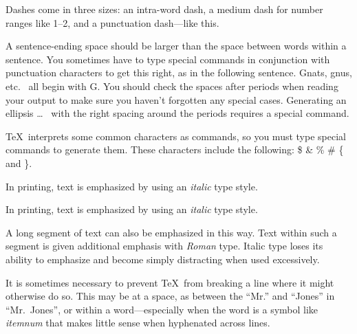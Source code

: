 \documentclass{cernatsreport}    %
\begin{document}
Dashes come in three sizes: an
       intra-word
dash, a medium dash for number ranges like
       1--2,
and a punctuation
       dash---like
this.

A sentence-ending space should be larger than the space between words
within a sentence.  You sometimes have to type special commands in
conjunction with punctuation characters to get this right, as in the
following sentence.
       Gnats, gnus, etc.\    %
       all begin with G\@.   %
You should check the spaces after periods when reading your output to
make sure you haven't forgotten any special cases.
Generating an ellipsis
       \ldots\    %
with the right spacing around the periods
requires a special  command.

\TeX\ interprets some common characters as commands, so you must type
special commands to generate them.  These characters include the
following:
       \$ \& \% \# \{ and \}.

In printing, text is emphasized by using an
      {\em italic}  %
type style.

In printing, text is emphasized by using an
      \emph{italic}  %
type style.

\begin{em}
   A long segment of text can also be emphasized in this way. Text within
   such a segment is given additional emphasis
          with\/ \emph{Roman}
   type.  Italic type loses its ability to emphasize and become simply
   distracting when used excessively.
\end{em}

It is sometimes necessary to prevent \TeX\ from breaking a line where
it might otherwise do so.  This may be at a space, as between the
``Mr.'' and ``Jones'' in
       ``Mr.~Jones'',        %
or within a word---especially when the word is a symbol like
       \mbox{\em itemnum\/}
that makes little sense when hyphenated across
       lines.
\end{document}
